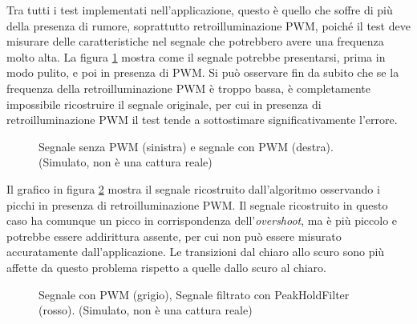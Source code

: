 Tra tutti i test implementati nell'applicazione, questo è quello che soffre di più della presenza di rumore, soprattutto retroilluminazione PWM, poiché il test deve misurare delle caratteristiche nel segnale che potrebbero avere una frequenza molto alta. La figura \ref{fig:pixelOverdriveTest_example1} mostra come il segnale potrebbe presentarsi, prima in modo pulito, e poi in presenza di PWM. Si può osservare fin da subito che se la frequenza della retroilluminazione PWM è troppo bassa, è completamente impossibile ricostruire il segnale originale, per cui in presenza di retroilluminazione PWM il test tende a sottostimare significativamente l'errore.

\begin{figure}[H]
	\centering
	\caption{Segnale senza PWM (sinistra) e segnale con PWM (destra). (Simulato, non è una cattura reale)}
	\label{fig:pixelOverdriveTest_example1}
\end{figure}

Il grafico in figura \ref{fig:pixelOverdriveTest_example2} mostra il segnale ricostruito dall'algoritmo osservando i picchi in presenza di retroilluminazione PWM. Il segnale ricostruito in questo caso ha comunque un picco in corrispondenza dell'\textit{overshoot}, ma è più piccolo e potrebbe essere addirittura assente, per cui non può essere misurato accuratamente dall'applicazione. Le transizioni dal chiaro allo scuro sono più affette da questo problema rispetto a quelle dallo scuro al chiaro.

\begin{figure}[H]
	\centering
	\caption{Segnale con PWM (grigio), Segnale filtrato con PeakHoldFilter (rosso). (Simulato, non è una cattura reale)}
	\label{fig:pixelOverdriveTest_example2}
\end{figure}

